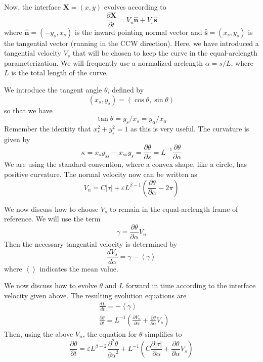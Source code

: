\documentclass[11pt]{article}
\newcommand{\pd}[2]    { \frac{\partial #1} {\partial #2} }
\newcommand{\ppd}[2]  { \frac{\partial^2 #1}{{\partial #2}^2} }
\newcommand{\td}[2] { \frac{d #1} { d #2 } }
\newcommand{\bvec}[1]{\ensuremath{\boldsymbol{#1}}}
\newcommand{\abs}[1]{\left| #1 \right|}
\newcommand{\mean}[1]{\left< #1 \right>}
\newcommand{\nhat}{\hat{\bvec{n}}}
\newcommand{\shat}{\hat{\bvec{s}}}
\newcommand{\eps}{\varepsilon}
\newcommand{\atau}{\abs{\tau}}
\newcommand{\X}{\bvec{X}}
\begin{document}
Now, the interface $\X = (x,y)$ evolves according to
\begin{equation}
\pd{\bvec{X}}{t} = V_n \nhat + V_s \shat
\end{equation}
where $\nhat = (-y_s, x_s)$ is the inward pointing normal vector and $\shat = (x_s, y_s)$ is the tangential vector (running in the CCW direction). Here, we have introduced a tangential velocity $V_s$ that will be chosen to keep the curve in the equal-arclength parameterization. We will frequently use a normalized arclength $\alpha = s/L$, where $L$ is the total length of the curve.

We introduce the tangent angle $\theta$, defined by
\begin{equation}
(x_s, y_s) = (\cos \theta, \sin \theta)
\end{equation}
so that we have
\begin{equation}
\tan \theta = y_s/x_s = y_\alpha / x_\alpha
\end{equation}
Remember the identity that $x_s^2 + y_s^2 = 1$ as this is very useful.
The curvature is given by
\begin{equation}
\kappa = x_s y_{ss} - x_{ss} y_s = \pd{\theta}{s} = L^{-1} \pd{\theta}{\alpha}
\end{equation}
We are using the standard convention, where a convex shape, like a circle, has positive curvature. The normal velocity now can be written as
\begin{equation}
V_n = C \atau + \eps L^{\beta-1} \left(\pd{\theta}{\alpha} - 2 \pi \right)
\end{equation}

We now discuss how to choose $V_s$ to remain in the equal-arclength frame of reference. We will use the term
\begin{equation}
\gamma = \pd{\theta}{\alpha} V_n
\end{equation}
Then the necessary tangential velocity is determined by
\begin{equation}
\td{V_s}{\alpha} = \gamma - \mean{\gamma}
\end{equation}
where $\mean{}$ indicates the mean value.

We now discuss how to evolve $\theta$ and $L$ forward in time according to the interface velocity given above. The resulting evolution equations are
\begin{align}
& \td{L}{t} = - \mean{\gamma} \\
& \pd{\theta}{t} = L^{-1} \left( \pd{V_n}{\alpha} + \pd{\theta}{\alpha} V_s \right)
\end{align}
Then, using the above $V_n$, the equation for $\theta$ simplifies to
\begin{equation}
\pd{\theta}{t} = \eps L^{\beta-2} \ppd{\theta}{\alpha} + L^{-1} \left( C \pd{\atau}{\alpha} + \pd{\theta}{\alpha} V_s \right)
\end{equation}
\end{document}
